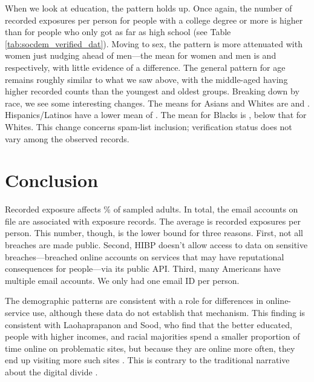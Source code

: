 \documentclass[sigconf]{acmart}
\begin{document}
When we look at education, the pattern holds up. Once again, the number of recorded exposures per person for people with a college degree or more is higher than for people who only got as far as high school (see Table \ref{tab:socdem_verified_dat}). Moving to sex, the pattern is more attenuated with women just nudging ahead of men---the mean for women and men is \femaleNonspamMean{} and \maleNonspamMean{} respectively, with little evidence of a difference.  The general pattern for age remains roughly similar to what we saw above, with the middle-aged having higher recorded counts than the youngest and oldest groups. Breaking down by race, we see some interesting changes. The means for Asians and Whites are \asianNonspamMean{} and \whiteNonspamMean{}. Hispanics/Latinos have a lower mean of \hispanicNonspamMean{}. The mean for Blacks is \blackNonspamMean{}, below that for Whites. This change concerns spam-list inclusion; verification status does not vary among the observed records.

\section{Conclusion}

Recorded exposure affects \exposedPercent{}\% of sampled adults. In total, the \sampleSize{} email accounts on file are associated with \eventCount{} exposure records. The average is \meanExposures{} recorded exposures per person. This number, though, is the lower bound for three reasons. First, not all breaches are made public. Second, HIBP doesn't allow access to data on sensitive breaches---breached online accounts on services that may have reputational consequences for people---via its public API. Third, many Americans have multiple email accounts. We only had one email ID per person.

The demographic patterns are consistent with a role for differences in online-service use, although these data do not establish that mechanism. This finding is consistent with Laohaprapanon and Sood, who find that the better educated, people with higher incomes, and racial majorities spend a smaller proportion of time online on problematic sites, but because they are online more often, they end up visiting more such sites \cite{laohaprapanon}. This is contrary to the traditional narrative about the digital divide \cite{van2011internet}.

\clearpage


\end{document}
